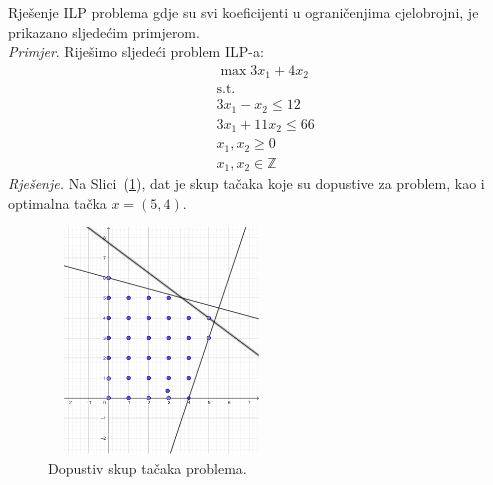 \documentclass[a4paper, utf8, 11pt, colorlinks]{book}
\begin{document}
Rješenje ILP problema gdje su svi koeficijenti u ograničenjima cjelobrojni, je prikazano sljedećim primjerom. \\
\emph{Primjer}. Riješimo sljedeći problem ILP-a:
\begin{align*}
    &\max 3 x_1 + 4 x_2 \\
    &\mbox{s.t.} \\
    & 3 x_1 - x_2 \leq 12 \\
    & 3 x_1 + 11 x_2 \leq 66 \\
    & x_1, x_2 \geq 0 \\
    & x_1, x_2 \in \mathbb{Z}
\end{align*}
\emph{Rješenje. }
Na Slici~(\ref{fig:region_ilp_primjer_2}), dat je skup tačaka koje su dopustive za problem, kao i optimalna tačka $x=(5,4)$.
\begin{figure}
    \centering
    \includegraphics[width=170pt,height=170pt]{region_ilp_primjer_2.eps}
    \caption{Dopustiv skup tačaka problema.}
    \label{fig:region_ilp_primjer_2}
\end{figure}
\end{document}
